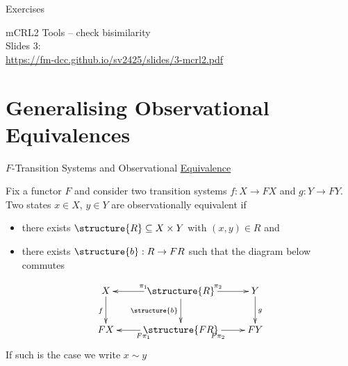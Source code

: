 \documentclass[aspectratio=169]{beamer}
\begin{document}
\begin{slide}{Exercises}


\end{slide}


\begin{frame}
  \huge\centering
  mCRL2 Tools -- check bisimilarity
  \\[5mm]\large
  Slides 3:\\\url{https://fm-dcc.github.io/sv2425/slides/3-mcrl2.pdf}
\end{frame}





\section{Generalising Observational Equivalences}

\begin{frame}{$F$-Transition Systems and Observational \underline{Equivalence}}

  \begin{definition}
    Fix a functor $F$ and consider two transition systems
    $f : X \to F X$ and $g : Y \to F Y$. Two states $x \in X$, $y \in Y$
    are \alert{observationally equivalent if}
      \begin{itemize}
         \item there exists 
      $\structure{R} \subseteq X \times Y$ with $(x,y) \in R$ and
         \item there exists  $\structure{b} : R \to FR$ such that the diagram below commutes
       \end{itemize} 
    \[
      \xymatrix{
        X \ar[d]_{f} & \ar[l]_{\pi_1}  \structure{R} \ar[r]^{\pi_2} \ar[d]_{\structure{b}} & Y \ar[d]^{g} \\
        F X  & \ar[l]^{F \pi_1} \structure{FR} \ar[r]_{F \pi_2} & F Y
        }
    \]
    If such is the case we write \alert{$x \sim y$}  
  \end{definition}
\end{frame}
\end{document}
